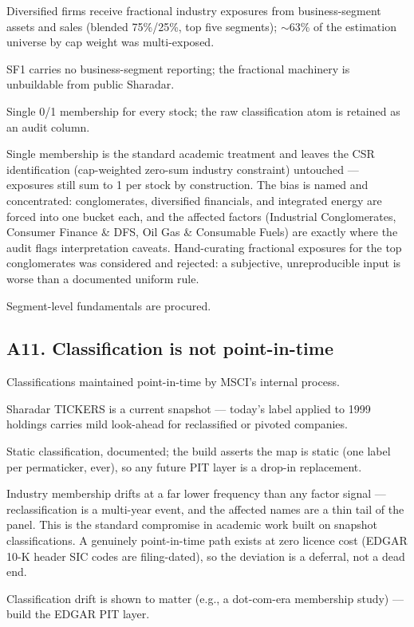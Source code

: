 \documentclass[11pt,a4paper]{article}
\begin{document}
\begin{description}[style=nextline]
  \item[USE4] Diversified firms receive fractional industry exposures from
    business-segment assets and sales (blended 75\%/25\%, top five segments);
    $\sim$63\% of the estimation universe by cap weight was multi-exposed.
  \item[Deviation] SF1 carries no business-segment reporting; the fractional
    machinery is unbuildable from public Sharadar.
  \item[Solution] Single 0/1 membership for every stock; the raw classification
    atom is retained as an audit column.
  \item[Validity] Single membership is the standard academic treatment and
    leaves the CSR identification (cap-weighted zero-sum industry constraint)
    untouched --- exposures still sum to 1 per stock by construction. The bias
    is named and concentrated: conglomerates, diversified financials, and
    integrated energy are forced into one bucket each, and the affected factors
    (Industrial Conglomerates, Consumer Finance \& DFS, Oil Gas \& Consumable
    Fuels) are exactly where the audit flags interpretation caveats. Hand-curating
    fractional exposures for the top conglomerates was considered and rejected:
    a subjective, unreproducible input is worse than a documented uniform rule.
  \item[Revisit when] Segment-level fundamentals are procured.
\end{description}

\subsection{A11. Classification is not point-in-time}

\begin{description}[style=nextline]
  \item[USE4] Classifications maintained point-in-time by MSCI's internal
    process.
  \item[Deviation] Sharadar TICKERS is a current snapshot --- today's label
    applied to 1999 holdings carries mild look-ahead for reclassified or
    pivoted companies.
  \item[Solution] Static classification, documented; the build asserts the map
    is static (one label per permaticker, ever), so any future PIT layer is a
    drop-in replacement.
  \item[Validity] Industry membership drifts at a far lower frequency than any
    factor signal --- reclassification is a multi-year event, and the affected
    names are a thin tail of the panel. This is the standard compromise in
    academic work built on snapshot classifications. A genuinely point-in-time
    path exists at zero licence cost (EDGAR 10-K header SIC codes are
    filing-dated), so the deviation is a deferral, not a dead end.
  \item[Revisit when] Classification drift is shown to matter (e.g., a
    dot-com-era membership study) --- build the EDGAR PIT layer.
\end{description}
\end{document}
